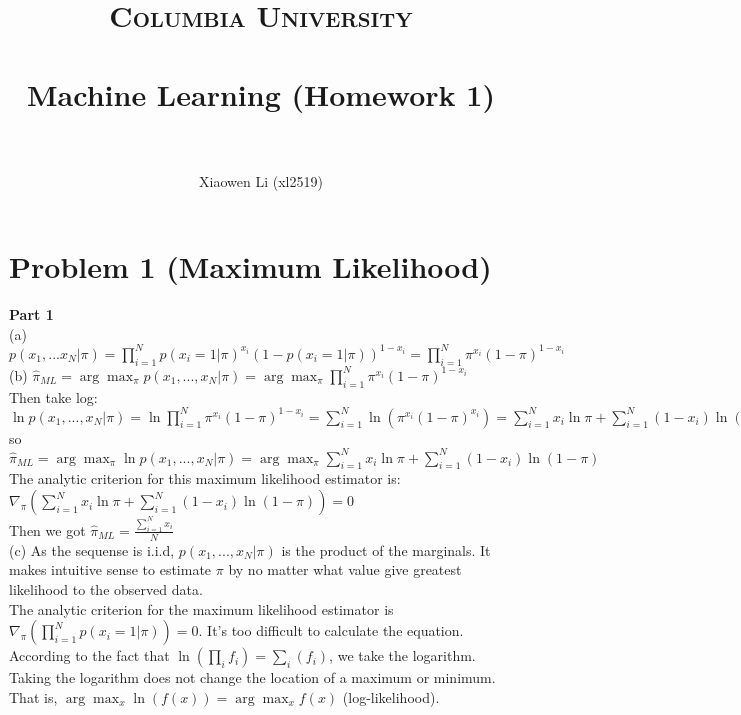 \documentclass[paper=a4, fontsize=11pt]{scrartcl} %
\title{	
\normalfont \normalsize 
\textsc{Columbia University} \\ [25pt] %
\horrule{0.5pt} \\[0.4cm] %
\huge Machine Learning (Homework 1) \\ %
\horrule{2pt} \\[0.5cm] %
}
\author{Xiaowen Li (xl2519)} %
\numberwithin{equation}{section} %
\numberwithin{figure}{section} %
\numberwithin{table}{section} %
\begin{document}
\maketitle %


\section{Problem 1 (Maximum Likelihood)}

\textbf{Part 1} \\

(a) $ p(x_1,...x_N|\pi) = \prod_{i=1}^{N}p(x_i=1|\pi)^{x_i}(1-p(x_i=1|\pi))^{1-x_i} =  \prod_{i=1}^{N} \pi^{x_i}(1-\pi)^{1-x_i}$ \\

(b) $ \hat{\pi}_{ML} = \arg\max_{\pi} p(x_1,...,x_N|\pi) =  \arg\max_{\pi} \prod_{i=1}^{N}\pi^{x_i}(1-\pi)^{1-x_i} $\\
Then take log: $ \ln p(x_1,...,x_N|\pi)  = \ln \prod_{i=1}^{N}\pi^{x_i}(1-\pi)^{1-x_i} = \sum_{i=1}^{N}\ln(\pi^{x_i}(1-\pi)^{x_i}) = \sum_{i=1}^{N}x_i\ln\pi + \sum_{i=1}^{N}(1-x_i)\ln(1-\pi)$ \\
so $ \hat{\pi}_{ML} = \arg\max_{\pi} \ln p(x_1,...,x_N|\pi) = \arg\max_{\pi} \sum_{i=1}^{N}x_i\ln\pi + \sum_{i=1}^{N}(1-x_i)\ln(1-\pi) $ \\
The analytic criterion for this maximum likelihood estimator is: $ \nabla_\pi (\sum_{i=1}^{N}x_i\ln\pi + \sum_{i=1}^{N}(1-x_i)\ln(1-\pi)) = 0 $  \\
Then we got $ \hat{\pi}_{ML} = \frac{\sum_{i=1}^{N}x_i}{N} $ \\
     
(c) As the sequense is i.i.d, $ p(x_1,...,x_N|\pi) $ is the product of the marginals. It makes intuitive sense to estimate $ \pi $ by no matter what value give greatest likelihood to the observed data. \\
The analytic criterion for the maximum likelihood estimator is $ \nabla_\pi(\prod_{i=1}^{N}p(x_i=1|\pi)) = 0 $. It's too difficult to calculate the equation. According to the fact that $ \ln(\prod_i f_i) = \sum_i(f_i) $, we take the logarithm. Taking the logarithm does not change the location of a maximum or minimum. That is, $ \arg\max_x \ln(f(x)) = \arg\max_x f(x) $ (log-likelihood). \\
\end{document}
